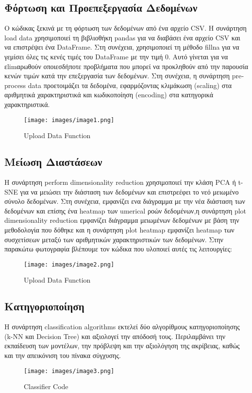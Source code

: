 \documentclass{article}
\begin{document}
\subsection{Φόρτωση και Προεπεξεργασία Δεδομένων}
Ο κώδικας ξεκινά με τη φόρτωση των δεδομένων από ένα αρχείο \textlatin{CSV}. Η συνάρτηση \textlatin{load data} χρησιμοποιεί τη βιβλιοθήκη \textlatin{pandas} για να διαβάσει ένα αρχείο \textlatin{CSV} και να επιστρέψει ένα \textlatin{DataFrame}. Στη συνέχεια, χρησιμοποιεί τη μέθοδο \textlatin{fillna} για να γεμίσει όλες τις κενές τιμές του \textlatin{DataFrame} με την τιμή 0. Αυτό γίνεται για να εlimαρωθούν οποιεσδήποτε προβλήματα που μπορεί να προκληθούν από την παρουσία κενών τιμών κατά την επεξεργασία των δεδομένων. Στη συνέχεια, η συνάρτηση \textlatin{preprocess data} προετοιμάζει τα δεδομένα, εφαρμόζοντας κλιμάκωση (\textlatin{scaling}) στα αριθμητικά χαρακτηριστικά και κωδικοποίηση (\textlatin{encoding}) στα κατηγορικά χαρακτηριστικά. 
\\[0.8cm]
\begin{figure}[h]
   \centering
   \texttt{[image: images/image1.png]}
   \caption{Upload Data Function}
   \label{fig:example}
\end{figure}


\newpage\subsection{Μείωση Διαστάσεων}
Η συνάρτηση \textlatin{perform dimensionality reduction} χρησιμοποιεί την κλάση \textlatin{PCA} ή \textlatin{t-SNE} για να μειώσει την διάσταση των δεδομένων και επιστρεέφει το νεό μειωμένο σύνολο δεδομένων. Στη συνέχεια, εμφανίζει ενα διάγραμμα με την νέα διάσταση των δεδομένων και επίσης ένα \textlatin{heatmap} των \textlatin{umerical} ροών δεδομένων,η συνάρτηση \textlatin{plot dimensionality reduction} εμφανίζει διάγραμμα μειωμένων δεδομένων με βάση την μεθοδολογία που δόθηκε και η συνάρτηση \textlatin{plot heatmap} εμφανίζει \textlatin{heatmap} των συσχετίσεων μεταξύ των αριθμητικών χαρακτηριστικών των δεδομένων. Στην παρακώτω φωτογραφία βλέπουμε τον κώδικα που υλοποιεί αυτές τις λειτουργίες: 
\\[0.8cm]
\begin{figure}[h]
   \centering
   \texttt{[image: images/image2.png]}
   \caption{\textlatin{Upload Data Function}}
   \label{fig:example}
\end{figure}
\newpage\subsection{Κατηγοριοποίηση}
Η συνάρτηση \textlatin{classification algorithms} εκτελεί δύο αλγορίθμους κατηγοριοποίησης (\textlatin{k-NN} και \textlatin{Decision Tree}) και αξιολογεί την απόδοσή τους. Περιλαμβάνει την εκπαίδευση των μοντέλων, την πρόβλεψη και την αξιολόγηση της ακρίβειας, καθώς και την απεικόνιση του πίνακα σύγχυσης. 
\begin{figure}[h]
   \centering
   \texttt{[image: images/image3.png]}
   \caption{\textlatin{Classifier Code}}
   \label{fig:example}
\end{figure}
\end{document}
